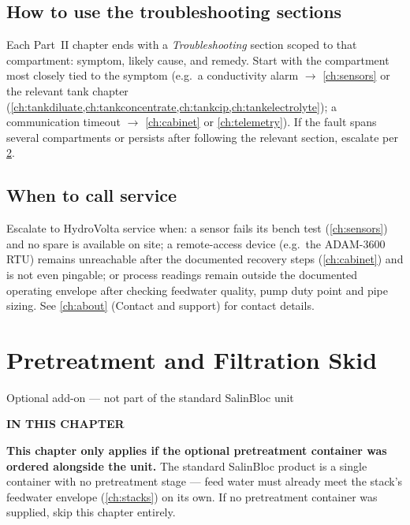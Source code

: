 \documentclass[a4paper,11pt,twoside,openright,numbers=noenddot]{scrreprt}
\newcommand{\chaptersubtitle}[1]{%
  \vspace{-12pt}\par
  {\sffamily\fontsize{13}{17}\selectfont\color{hvmuted}\raggedright #1\par}
  \vspace{10pt}}
\newcommand{\chaptertoc}{%
  \begingroup
  \etocsetnexttocdepth{1}%
  \etocsettocstyle
    {{\sffamily\bfseries\footnotesize\color{hvmuted}IN THIS CHAPTER\par}%
     \vspace{5pt}{\color{hvink}\rule{\linewidth}{1.2pt}}\par\vspace{2pt}}{}%
  \etocsetstyle{section}{}{}
    {\par\vspace{4pt}\noindent
     \makebox[11mm][l]{\sffamily\bfseries\small\color{hvprimary}\etocnumber}%
     \sffamily\small\etocname\hfill{\color{hvmuted}\etocpage}%
     \par\vspace{4pt}{\color{hvrule}\rule{\linewidth}{0.4pt}}}{}%
  \localtableofcontents
  \endgroup}
\newcommand{\salinbloc}{SalinBloc\texttrademark\xspace}
\begin{document}
\section{How to use the troubleshooting sections}
Each Part~II chapter ends with a \emph{Troubleshooting} section scoped to
that compartment: symptom, likely cause, and remedy. Start with the
compartment most closely tied to the symptom (e.g.\ a conductivity alarm
$\rightarrow$ \cref{ch:sensors} or the relevant tank chapter
(\cref{ch:tankdiluate,ch:tankconcentrate,ch:tankcip,ch:tankelectrolyte});
a communication timeout
$\rightarrow$ \cref{ch:cabinet} or \cref{ch:telemetry}). If the fault
spans several compartments or persists after following the relevant
section, escalate per \cref{sec:whentocallservice}.

\section{When to call service}
\label{sec:whentocallservice}
Escalate to HydroVolta service when: a sensor fails its bench test
(\cref{ch:sensors}) and no spare is available on site; a remote-access
device (e.g.\ the ADAM-3600 RTU) remains unreachable after the documented
recovery steps (\cref{ch:cabinet}) and is not even pingable; or process
readings remain outside the documented operating envelope after checking
feedwater quality, pump duty point and pipe sizing. See \cref{ch:about}
(Contact and support) for contact details.



\chapter{Pretreatment and Filtration Skid}
\label{ch:pretreatment}
\chaptersubtitle{Optional add-on --- not part of the standard \salinbloc unit}
\chaptertoc

\begin{notice}
\textbf{This chapter only applies if the optional pretreatment container
was ordered alongside the unit.} The standard \salinbloc product is a
single container with no pretreatment stage --- feed water must already
meet the stack's feedwater envelope (\cref{ch:stacks}) on its own. If no
pretreatment container was supplied, skip this chapter entirely.
\end{notice}
\end{document}
